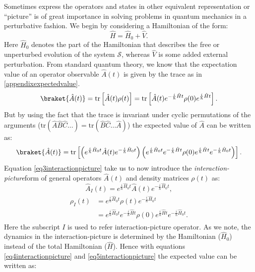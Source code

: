 \begin{appendix}
Sometimes express the operators and states in other equivalent representation or ``picture'' is of great importance in solving problems in quantum mechanics in a perturbative fashion.
We begin by considering a Hamiltonian of the form:
\begin{equation}
\hat{H}=\hat{H}_0 +\hat{V}.
\label{eq1interaction}
\end{equation}
Here $\hat{H}_0$ denotes the part of the Hamiltonian that describes the free or unperturbed evolution of the system $\mathcal{S}$, whereas $\hat{V}$ is some added external perturbation. From standard quantum theory, we know that the expectation value of an operator observable $\hat{A}(t)$ is given by the trace as in \eqref{appendixexpectedvalue}.
\begin{equation}
\braket{\hat{A}(t)}=\text{tr}\left[\hat{A}(t)\rho(t)\right]=\text{tr}\left[\hat{A}(t)e^{-\frac{i}{\hbar}\hat{H}t}\rho(0)e^{\frac{i}{\hbar}\hat{H}t}\right].
\label{eq2interactionpicture}
\end{equation}
But by using the fact that the trace is invariant under cyclic permutations of the arguments ($\text{tr}(\hat{A}\hat{B}\hat{C}\ldots)=\text{tr}(\hat{B}\hat{C}\ldots\hat{A})$) the expected value of $\hat{A}$ can be written as:
\begin{equation}
\braket{\hat{A}(t)}=\text{tr}\left[\left(e^{\frac{i}{\hbar}\hat{H}_0 t}\hat{A}(t)e^{-\frac{i}{\hbar}\hat{H}_0 t}\right)\left(e^{\frac{i}{\hbar}\hat{H}_0 t}e^{-\frac{i}{\hbar}\hat{H}t}\rho(0)e^{\frac{i}{\hbar}\hat{H}t}e^{-\frac{i}{\hbar}\hat{H}_0t}\right)\right].
\label{eq3interactionpicture}
\end{equation}
Equation  \eqref{eq3interactionpicture} take us to now introduce the \textit{interaction-picture}form of general operators $\hat{A}(t)$ and density matrices $\rho(t)$ as:
\begin{equation}
\hat{A}_I(t)=e^{\frac{i}{\hbar}\hat{H}_0t}\hat{A}(t)e^{-\frac{i}{\hbar}\hat{H}_0t},
\label{eq4interactionpicture}
\end{equation}
\begin{align}
\label{eq5interactionpicture}
\begin{split}
\rho_I(t)&=e^{\frac{i}{\hbar}\hat{H}_0t}\rho(t)e^{-\frac{i}{\hbar}\hat{H}_0t}
\\
&=e^{\frac{i}{\hbar}\hat{H}_0t}e^{-\frac{i}{\hbar}\hat{H}t}\rho(0)e^{\frac{i}{\hbar}\hat{H}t}e^{-\frac{i}{\hbar}\hat{H}_0t}.
\end{split}
\end{align}
Here the subscript $I$ is used to refer interaction-picture operator. As we note, the dynamics in the interaction-picture is determined by the  Hamiltonian ($\hat{H}_0$) instead of the total Hamiltonian ($\hat{H}$). Hence with equations \eqref{eq4interactionpicture} and \eqref{eq5interactionpicture} the expected value can be written as:

\end{appendix}
